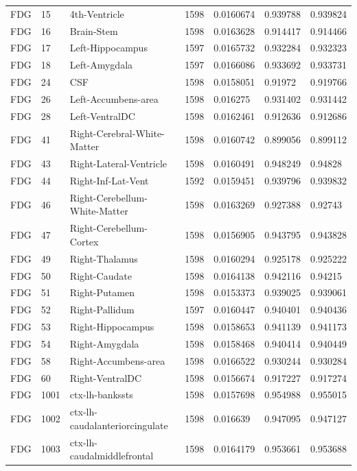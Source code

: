 \begin{landscape}
\begin{longtable}{lllllll}
FDG & 15 & 4th-Ventricle & 1598 & 0.0160674 & 0.939788 & 0.939824 \\
FDG & 16 & Brain-Stem & 1598 & 0.0163628 & 0.914417 & 0.914466 \\
FDG & 17 & Left-Hippocampus & 1597 & 0.0165732 & 0.932284 & 0.932323 \\
FDG & 18 & Left-Amygdala & 1597 & 0.0166086 & 0.933692 & 0.933731 \\
FDG & 24 & CSF & 1598 & 0.0158051 & 0.91972 & 0.919766 \\
FDG & 26 & Left-Accumbens-area & 1598 & 0.016275 & 0.931402 & 0.931442 \\
FDG & 28 & Left-VentralDC & 1598 & 0.0162461 & 0.912636 & 0.912686 \\
FDG & 41 & Right-Cerebral-White-Matter & 1598 & 0.0160742 & 0.899056 & 0.899112 \\
FDG & 43 & Right-Lateral-Ventricle & 1598 & 0.0160491 & 0.948249 & 0.94828 \\
FDG & 44 & Right-Inf-Lat-Vent & 1592 & 0.0159451 & 0.939796 & 0.939832 \\
FDG & 46 & Right-Cerebellum-White-Matter & 1598 & 0.0163269 & 0.927388 & 0.92743 \\
FDG & 47 & Right-Cerebellum-Cortex & 1598 & 0.0156905 & 0.943795 & 0.943828 \\
FDG & 49 & Right-Thalamus & 1598 & 0.0160294 & 0.925178 & 0.925222 \\
FDG & 50 & Right-Caudate & 1598 & 0.0164138 & 0.942116 & 0.94215 \\
FDG & 51 & Right-Putamen & 1598 & 0.0153373 & 0.939025 & 0.939061 \\
FDG & 52 & Right-Pallidum & 1597 & 0.0160447 & 0.940401 & 0.940436 \\
FDG & 53 & Right-Hippocampus & 1598 & 0.0158653 & 0.941139 & 0.941173 \\
FDG & 54 & Right-Amygdala & 1598 & 0.0158468 & 0.940414 & 0.940449 \\
FDG & 58 & Right-Accumbens-area & 1598 & 0.0166522 & 0.930244 & 0.930284 \\
FDG & 60 & Right-VentralDC & 1598 & 0.0156674 & 0.917227 & 0.917274 \\
FDG & 1001 & ctx-lh-bankssts & 1598 & 0.0157698 & 0.954988 & 0.955015 \\
FDG & 1002 & ctx-lh-caudalanteriorcingulate & 1598 & 0.016639 & 0.947095 & 0.947127 \\
FDG & 1003 & ctx-lh-caudalmiddlefrontal & 1598 & 0.0164179 & 0.953661 & 0.953688 \\

\end{longtable}
\end{landscape}
